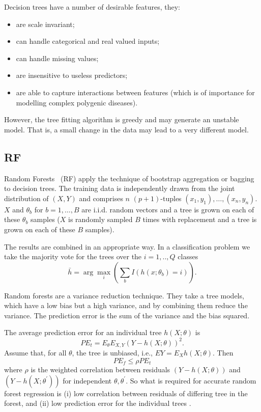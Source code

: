 \documentclass[10pt,a4paper]{article}  %
\begin{document}
Decision trees have a number of desirable features, they:
\begin{itemize}
  \item are scale invariant;
  \item can handle categorical and real valued inputs;
  \item can handle missing values;
  \item are insensitive to useless predictors;
  \item are able to capture interactions between features (which is of importance for modelling complex polygenic diseases).
  \end{itemize}
However, the tree fitting algorithm is greedy and may generate an unstable model. That is, a small change in the data may
lead to a very different model. 

\subsection*{RF}  

Random Forests~\cite{Breiman.2001} (RF) apply the technique of bootstrap aggregation or bagging to decision trees.  The training
data is independently drawn from the joint distribution of $(X,Y)$ and comprises $n$ $(p+1)$-tuples $(x_1,y_1),\ldots, (x_n,y_n)$.
$X$ and $\theta_b$ for $b=1,\ldots,B$ are i.i.d. random vectors and a tree is grown on each of these $\theta_b$  samples 
($X$ is randomly sampled $B$ times with replacement and a tree is grown on each of these $B$ samples). 

The results are combined in an appropriate way. In a classification problem we take the majority vote for the trees over
the $i=1,..,Q$ classes
\begin{equation*}
{\bar {h}}=  \arg \max_i \left(\sum_b I(h(x;\theta_b)=i)\right).
\end{equation*}

Random forests are a variance reduction technique. They take a tree models, which have a low bias but a high variance, and
by combining them reduce the variance. The prediction error is the sum of the variance and the bias squared. 

The average prediction error for an individual tree $h(X; \theta)$ is
\begin{equation}
PE_t = E_\theta E_{X,Y} (Y-h(X; \theta))^2.
\end{equation}
Assume that, for all  $\theta$, the tree is unbiased, i.e., $EY= E_X h(X; \theta)$. Then
\begin{equation}
PE_f \leq \rho PE_t
\end{equation}
where $\rho$ is the weighted correlation between residuals $(Y-h(X;\theta))$ and $(Y-h(X;\theta^\prime))$ for independent $\theta,
\theta^\prime$.  
So what is required for  accurate random forest regression is (i) low correlation between residuals of differing tree in
the forest, and (ii) low prediction error for the individual trees \cite{Segal.2004}.
\end{document}
